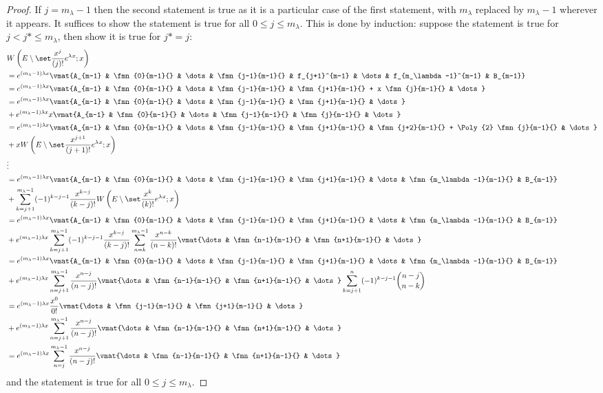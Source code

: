 \documentclass{book}
\begin{document}
\begin{proof}
If $j = m_\lambda-1$ then the second statement is true as it is a particular case of the first statement, with $m_\lambda$ replaced by $m_\lambda-1$ wherever it appears.
It suffices to show the statement is true for all $0 \leq j \leq m_\lambda$.
This is done by induction: suppose the statement is true for $j < j* \leq m_\lambda$, then show it is true for $j* = j$:
\begin{equation*}
\begin{split}
& \Wspec{j}{} \\
& = \eone \vmat{A_{m-1} & \fmn{0}{m-1}{} & \dots & \fmn{j-1}{m-1}{} & f_{j+1}^{m-1} & \dots & f_{m_\lambda-1}^{m-1} & B_{m-1}} \\
& = \eone \vmat{A_{m-1} & \fmn{0}{m-1}{} & \dots & \fmn{j-1}{m-1}{} & \fmn{j+1}{m-1}{} + x \fmn{j}{m-1}{} & \dots} \\
& = \eone \vmat{A_{m-1} & \fmn{0}{m-1}{} & \dots & \fmn{j-1}{m-1}{} & \fmn{j+1}{m-1}{} & \dots } \\
& + \eone x \vmat{A_{m-1} & \fmn{0}{m-1}{} & \dots & \fmn{j-1}{m-1}{} & \fmn{j}{m-1}{} & \dots } \\
& = \eone \vmat{A_{m-1} & \fmn{0}{m-1}{} & \dots & \fmn{j-1}{m-1}{} & \fmn{j+1}{m-1}{} & \fmn{j+2}{m-1}{} + \Poly{2} \fmn{j}{m-1}{} & \dots } \\
& + x \Wspec{j+1}{} \\
& \vdots \\
& = \eone \vmat{A_{m-1} & \fmn{0}{m-1}{} & \dots & \fmn{j-1}{m-1}{} & \fmn{j+1}{m-1}{} & \dots & \fmn{m_\lambda-1}{m-1}{} & B_{m-1}} \\
& + \sum_{k=j+1}^{m_\lambda-1} (-1)^{k-j-1} \poly{k-j} \Wspec{k}{} \\
& = \eone \vmat{A_{m-1} & \fmn{0}{m-1}{} & \dots & \fmn{j-1}{m-1}{} & \fmn{j+1}{m-1}{} & \dots & \fmn{m_\lambda-1}{m-1}{} & B_{m-1}} \\
& + \eone \sum_{k=j+1}^{m_\lambda-1} (-1)^{k-j-1} \poly{k-j} \sum_{n=k}^{m_\lambda-1} \poly{n-k} \vmat{\dots & \fmn{n-1}{m-1}{} & \fmn{n+1}{m-1}{} & \dots} \\
& = \eone \vmat{A_{m-1} & \fmn{0}{m-1}{} & \dots & \fmn{j-1}{m-1}{} & \fmn{j+1}{m-1}{} & \dots & \fmn{m_\lambda-1}{m-1}{} & B_{m-1}} \\
& + \eone \sum_{n=j+1}^{m_\lambda-1} \poly{n-j}  \vmat{\dots & \fmn{n-1}{m-1}{} & \fmn{n+1}{m-1}{} & \dots}\sum_{k=j+1}^{n} (-1)^{k-j-1} \binom{n-j}{n-k} \\
& = \eone \Poly{0} \vmat{\dots & \fmn{j-1}{m-1}{} & \fmn{j+1}{m-1}{} & \dots} \\
& + \eone \sum_{n=j+1}^{m_\lambda-1} \poly{n-j}  \vmat{\dots & \fmn{n-1}{m-1}{} & \fmn{n+1}{m-1}{} & \dots} \\
& = \eone \sum_{n=j}^{m_\lambda-1} \poly{n-j} \vmat{\dots & \fmn{n-1}{m-1}{} & \fmn{n+1}{m-1}{} & \dots}
\end{split}
\end{equation*}
and the statement is true for all $0 \leq j \leq m_\lambda$.
\end{proof}
\end{document}
